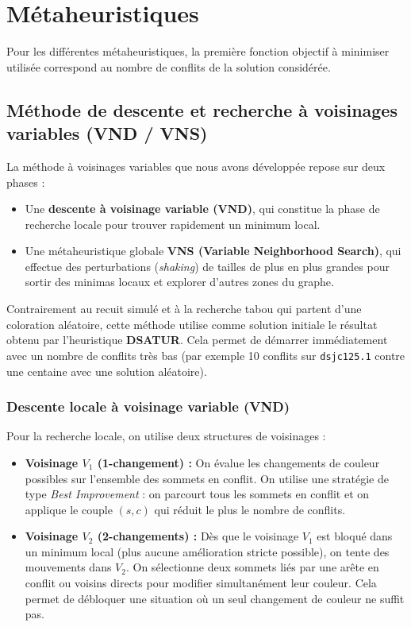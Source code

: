 \documentclass{article}
\begin{document}
\section{Métaheuristiques}
Pour les différentes métaheuristiques, la première fonction objectif à minimiser utilisée correspond au nombre de conflits de la solution considérée.

\subsection{Méthode de descente et recherche à voisinages variables (VND / VNS)}

La méthode à voisinages variables que nous avons développée repose sur deux phases :
\begin{itemize}
    \item Une \textbf{descente à voisinage variable (VND)}, qui constitue la phase de recherche locale pour trouver rapidement un minimum local.
    \item Une métaheuristique globale \textbf{VNS (Variable Neighborhood Search)}, qui effectue des perturbations (\textit{shaking}) de tailles de plus en plus grandes pour sortir des minimas locaux et explorer d'autres zones du graphe.\\
\end{itemize}
Contrairement au recuit simulé et à la recherche tabou qui partent d'une coloration aléatoire, cette méthode utilise comme solution initiale le résultat obtenu par l'heuristique \textbf{DSATUR}. Cela permet de démarrer immédiatement avec un nombre de conflits très bas (par exemple 10 conflits sur \texttt{dsjc125.1} contre une centaine avec une solution aléatoire).

\subsubsection{Descente locale à voisinage variable (VND)}

Pour la recherche locale, on utilise deux structures de voisinages :
\begin{itemize}
    \item \textbf{Voisinage $V_1$ (1-changement) :} On évalue les changements de couleur possibles sur l'ensemble des sommets en conflit. On utilise une stratégie de type \textit{Best Improvement} : on parcourt tous les sommets en conflit et on applique le couple $(s, c)$ qui réduit le plus le nombre de conflits.
    \item \textbf{Voisinage $V_2$ (2-changements) :} Dès que le voisinage $V_1$ est bloqué dans un minimum local (plus aucune amélioration stricte possible), on tente des mouvements dans $V_2$. On sélectionne deux sommets liés par une arête en conflit ou voisins directs pour modifier simultanément leur couleur. Cela permet de débloquer une situation où un seul changement de couleur ne suffit pas.\\
\end{itemize}
\end{document}
